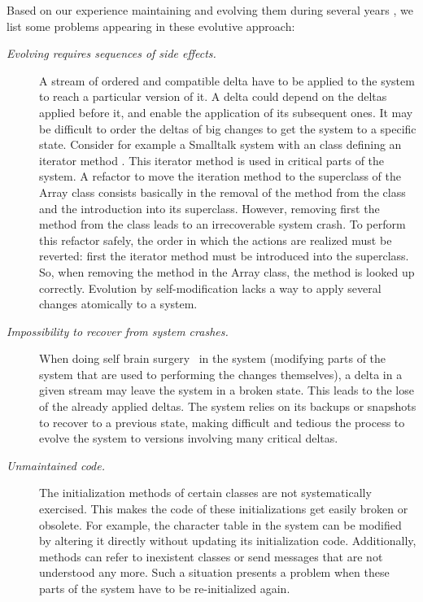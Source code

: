 
Based on our experience maintaining and evolving them during several years \cite{Denk07a}, we list some problems appearing in these evolutive approach: 
\begin{description}

\item[\emph{Evolving requires sequences of side effects.}] A stream of ordered and compatible delta have to be applied to the system to reach a particular version of it. A delta could depend on the deltas applied before it, and enable the application of its subsequent ones. It may be difficult to order the deltas of big changes to get the system to a specific state. 
Consider for example a Smalltalk system with an  class defining an iterator method .
This iterator method is used in critical parts of the system.
A refactor to move the iteration method to the superclass of the Array class consists basically in the removal of the method from the  class and the introduction into its superclass.
However, removing first the method from the  class leads to an irrecoverable system crash.
To perform this refactor safely, the order in which the actions are realized must be reverted: first the iterator method must be introduced into the superclass.
So, when removing the method in the Array class, the method is looked up correctly.
Evolution by self-modification lacks a way to apply several changes atomically to a system.

\item[\em{Impossibility to recover from system crashes.}] When doing self brain surgery~\cite{Casa09a} in the system (modifying parts of the system that are used to performing the changes themselves), a delta in a given stream may leave the system in a broken state. This leads to the lose of the already applied deltas. The system relies on its backups or snapshots to recover to a previous state, making difficult and tedious the process to evolve the system to versions involving many critical deltas. 

\item[\emph{Unmaintained code.}] The initialization methods of certain classes are not systematically exercised. This makes the code of these initializations get easily broken or obsolete. For example, the character table in the system can be modified by altering it directly without updating its initialization code. Additionally, methods can refer to inexistent classes or send messages that are not understood any more. Such a situation presents a problem when these parts of the system have to be re-initialized again.


\end{description}
